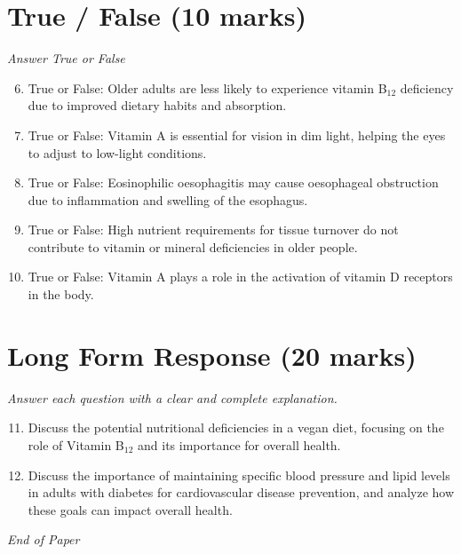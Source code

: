 \documentclass[12pt]{article}
\begin{document}
\section*{True / False (10 marks)}
\textit{Answer True or False}
\begin{enumerate}[label=\arabic*.]
\setcounter{enumi}{5}
\item True or False: Older adults are less likely to experience vitamin B$_{12}$ deficiency due to improved dietary habits and absorption.
\item True or False: Vitamin A is essential for vision in dim light, helping the eyes to adjust to low-light conditions.
\item True or False: Eosinophilic oesophagitis may cause oesophageal obstruction due to inflammation and swelling of the esophagus.
\item True or False: High nutrient requirements for tissue turnover do not contribute to vitamin or mineral deficiencies in older people.
\item True or False: Vitamin A plays a role in the activation of vitamin D receptors in the body.
\end{enumerate}

\section*{Long Form Response (20 marks)}
\textit{Answer each question with a clear and complete explanation.}
\begin{enumerate}[label=\arabic*.]
\setcounter{enumi}{10}
\item Discuss the potential nutritional deficiencies in a vegan diet, focusing on the role of Vitamin B$_{12}$ and its importance for overall health.
\item Discuss the importance of maintaining specific blood pressure and lipid levels in adults with diabetes for cardiovascular disease prevention, and analyze how these goals can impact overall health.
\end{enumerate}

\vfill
\noindent\textit{End of Paper}
\end{document}
